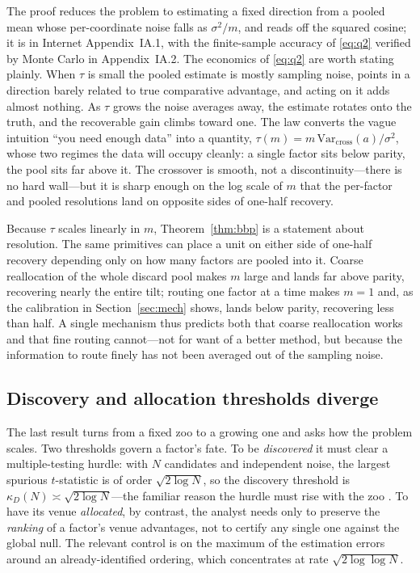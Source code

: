 \documentclass[12pt]{article}
\theoremstyle{plain}
\theoremstyle{definition}
\newcommand{\Var}{\mathrm{Var}}
\begin{document}
\noindent The proof reduces the problem to estimating a fixed direction from a
pooled mean whose per-coordinate noise falls as $\sigma^2/m$, and reads off the
squared cosine; it is in Internet Appendix~IA.1, with the finite-sample accuracy
of \eqref{eq:q2} verified by Monte Carlo in Appendix~IA.2. The economics of
\eqref{eq:q2} are worth stating plainly. When $\tau$ is small the pooled estimate
is mostly sampling noise, points in a direction barely related to true
comparative advantage, and acting on it adds almost nothing. As $\tau$ grows the
noise averages away, the estimate rotates onto the truth, and the recoverable
gain climbs toward one. The law converts the vague intuition ``you need enough
data'' into a quantity, $\tau(m)=m\,\Var_{\text{cross}}(a)/\sigma^2$, whose two
regimes the data will occupy cleanly: a single factor sits below parity, the
pool sits far above it. The crossover is smooth, not a discontinuity---there is
no hard wall---but it is sharp enough on the log scale of $m$ that the per-factor
and pooled resolutions land on opposite sides of one-half recovery.

Because $\tau$ scales linearly in $m$, Theorem~\ref{thm:bbp} is a statement about
resolution. The same primitives can place a unit on either side of one-half
recovery depending only on how many factors are pooled into it. Coarse
reallocation of the whole discard pool makes $m$ large and lands far above
parity, recovering nearly the entire tilt; routing one factor at a time makes
$m=1$ and, as the calibration in Section~\ref{sec:mech} shows, lands below parity,
recovering less than half. A single mechanism thus predicts both that coarse
reallocation works and that fine routing cannot---not for want of a better
method, but because the information to route finely has not been averaged out of
the sampling noise.

\subsection{Discovery and allocation thresholds diverge}

The last result turns from a fixed zoo to a growing one and asks how the problem
scales. Two thresholds govern a factor's fate. To be \emph{discovered} it must
clear a multiple-testing hurdle: with $N$ candidates and independent noise, the
largest spurious $t$-statistic is of order $\sqrt{2\log N}$, so the discovery
threshold is $\kappa_D(N)\asymp\sqrt{2\log N}$---the familiar reason the hurdle
must rise with the zoo \citep{HarveyLiuZhu2016}. To have its venue
\emph{allocated}, by contrast, the analyst needs only to preserve the
\emph{ranking} of a factor's venue advantages, not to certify any single one
against the global null. The relevant control is on the maximum of the
estimation errors around an already-identified ordering, which concentrates at
rate $\sqrt{2\log\log N}$.
\end{document}
